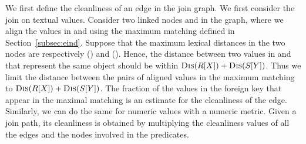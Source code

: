 We first define the cleanliness of an edge in the join graph. We first consider the join on textual values. Consider two linked nodes \RX and \SY in the graph, where we align the values in \RX and \SY using the maximum matching defined in Section~\ref{subsec:eind}. Suppose that the maximum lexical distances in the two nodes are respectively \Dis(\RX) and \Dis(\SY). Hence, the distance between two values in \RX and \SY that represent the same object should be within $\textsc{Dis}(R[X])+\textsc{Dis}(S[Y])$. Thus we limit the distance between the pairs of aligned values in the maximum matching to $\textsc{Dis}(R[X])+\textsc{Dis}(S[Y])$. The fraction of the values in the foreign key that appear in the maximal matching is an estimate for the cleanliness of the edge. Similarly, we can do the same  for numeric values with a numeric metric.
Given a join path, its cleanliness is obtained by multiplying the cleanliness values of all the edges and the nodes involved in the predicates.






